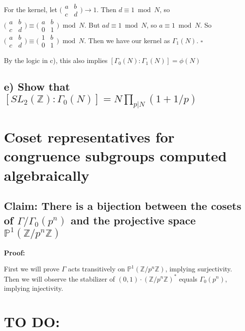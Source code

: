 \documentclass[11pt, oneside]{article}   	%
\begin{document}
For the kernel, let $\bigl( \begin{smallmatrix}a & b\\ c & d\end{smallmatrix}\bigr)\rightarrow 1$. Then $d\equiv 1 \bmod N$, so $\bigl( \begin{smallmatrix}a & b\\ c & d\end{smallmatrix}\bigr)\equiv \bigl( \begin{smallmatrix}a & b\\ 0 & 1\end{smallmatrix}\bigr)\bmod N$. But $ad\equiv 1\bmod N$, so $a\equiv 1 \bmod N$. So $\bigl( \begin{smallmatrix}a & b\\ c & d\end{smallmatrix}\bigr) \equiv \bigl( \begin{smallmatrix}1 & b\\ 0 & 1\end{smallmatrix}\bigr)\bmod N$. Then we have our kernel as $\Gamma_1 (N)$. $\square$

By the logic in c), this also implies $[\Gamma_0 (N):\Gamma_1 (N)]=\phi(N)$

\subsection*{e) Show that $[SL_2(\mathbb{Z}):\Gamma_0 (N)]=N\prod_{p\vert N} (1+1/p)$}

\section*{Coset representatives for congruence subgroups computed algebraically}

\subsection*{Claim: There is a bijection between the cosets of $\Gamma/\Gamma_0 (p^n)$ and the projective space $\mathbb{P}^1(\mathbb{Z}/p^n\mathbb{Z})$}

\textbf{Proof:}

First we will prove $\Gamma$ acts transitively on $\mathbb{P}^1(\mathbb{Z}/p^n\mathbb{Z})$, implying surjectivity. Then we will observe the stabilizer of $(0,1)\cdot(\mathbb{Z}/p^n\mathbb{Z})^*$ equals $\Gamma_0 (p^n)$, implying injectivity.

\section*{TO DO:}
\end{document}
